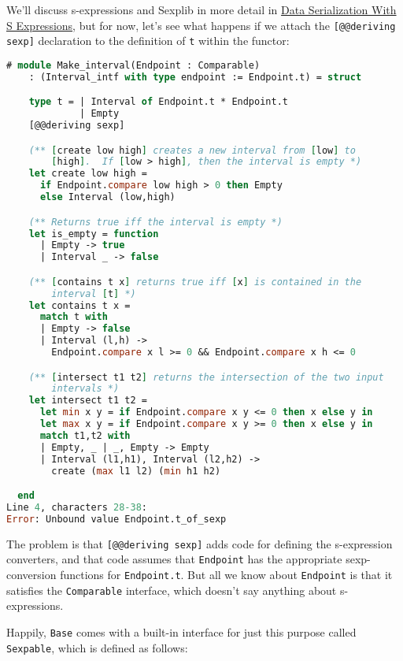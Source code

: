 We'll discuss s-expressions and Sexplib in more detail in
\href{data-serialization.html\#data-serialization-with-s-expressions}{Data
Serialization With S Expressions}, but for now, let's see what happens
if we attach the \passthrough{\lstinline![@@deriving sexp]!} declaration
to the definition of \passthrough{\lstinline!t!} within the functor:

\begin{lstlisting}[language=Caml]
# module Make_interval(Endpoint : Comparable)
    : (Interval_intf with type endpoint := Endpoint.t) = struct

    type t = | Interval of Endpoint.t * Endpoint.t
             | Empty
    [@@deriving sexp]

    (** [create low high] creates a new interval from [low] to
        [high].  If [low > high], then the interval is empty *)
    let create low high =
      if Endpoint.compare low high > 0 then Empty
      else Interval (low,high)

    (** Returns true iff the interval is empty *)
    let is_empty = function
      | Empty -> true
      | Interval _ -> false

    (** [contains t x] returns true iff [x] is contained in the
        interval [t] *)
    let contains t x =
      match t with
      | Empty -> false
      | Interval (l,h) ->
        Endpoint.compare x l >= 0 && Endpoint.compare x h <= 0

    (** [intersect t1 t2] returns the intersection of the two input
        intervals *)
    let intersect t1 t2 =
      let min x y = if Endpoint.compare x y <= 0 then x else y in
      let max x y = if Endpoint.compare x y >= 0 then x else y in
      match t1,t2 with
      | Empty, _ | _, Empty -> Empty
      | Interval (l1,h1), Interval (l2,h2) ->
        create (max l1 l2) (min h1 h2)

  end
Line 4, characters 28-38:
Error: Unbound value Endpoint.t_of_sexp
\end{lstlisting}

The problem is that \passthrough{\lstinline![@@deriving sexp]!} adds
code for defining the s-expression converters, and that code assumes
that \passthrough{\lstinline!Endpoint!} has the appropriate
sexp-conversion functions for \passthrough{\lstinline!Endpoint.t!}. But
all we know about \passthrough{\lstinline!Endpoint!} is that it
satisfies the \passthrough{\lstinline!Comparable!} interface, which
doesn't say anything about s-expressions.

Happily, \passthrough{\lstinline!Base!} comes with a built-in interface
for just this purpose called \passthrough{\lstinline!Sexpable!}, which
is defined as follows:

